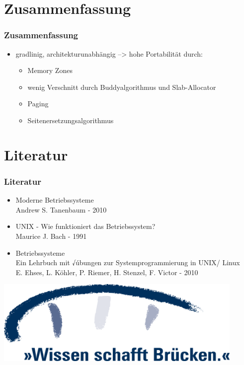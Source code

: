 \documentclass[ddcfooter,nosectionnum]{tudbeamer}
\begin{document}
\section{Zusammenfassung}
\begin{frame}
    \frametitle{Zusammenfassung}
    \begin{itemize}
    	\item gradlinig, architekturunabhängig --> hohe Portabilität durch:
		\begin{itemize}
			\item Memory Zones
			\item wenig Verschnitt durch Buddyalgorithmus und Slab-Allocator 			\item Paging
			\item Seitenersetzungsalgorithmus
		\end{itemize}
	 \end{itemize}
    
\end{frame}


\section{Literatur}
\begin{frame}
    \frametitle{Literatur}
    \begin{itemize}
         \item  Moderne Betriebssysteme \\
        		Andrew S. Tanenbaum - 2010
	\item	 UNIX - Wie funktioniert das Betriebssystem? \\
		Maurice J. Bach - 1991
	\item Betriebssysteme\\
		Ein Lehrbuch mit √úbungen zur Systemprogrammierung in UNIX/ Linux \\
		E. Ehses, L. Köhler, P. Riemer, H. Stenzel, F. Victor - 2010	
    \end{itemize}
    
\end{frame}

\begin{frame}

	\includegraphics[width= 0.9\textwidth]{br_logo_blau.png}

  \end{frame}
\end{document}
